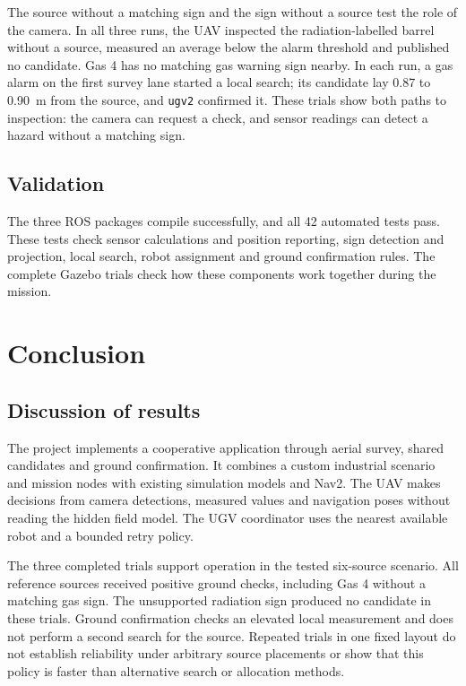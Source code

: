 \documentclass[conference]{IEEEtran}
\begin{document}
The source without a matching sign and the sign without a source test the role of the camera. In all three runs, the UAV inspected the radiation-labelled barrel without a source, measured an average below the alarm threshold and published no candidate. Gas 4 has no matching gas warning sign nearby. In each run, a gas alarm on the first survey lane started a local search; its candidate lay 0.87 to \SI{0.90}{\metre} from the source, and \texttt{ugv2} confirmed it. These trials show both paths to inspection: the camera can request a check, and sensor readings can detect a hazard without a matching sign.

\subsection{Validation}
The three ROS packages compile successfully, and all 42 automated tests pass. These tests check sensor calculations and position reporting, sign detection and projection, local search, robot assignment and ground confirmation rules. The complete Gazebo trials check how these components work together during the mission.

\section{Conclusion}
\subsection{Discussion of results}
The project implements a cooperative application through aerial survey, shared candidates and ground confirmation. It combines a custom industrial scenario and mission nodes with existing simulation models and Nav2. The UAV makes decisions from camera detections, measured values and navigation poses without reading the hidden field model. The UGV coordinator uses the nearest available robot and a bounded retry policy.

The three completed trials support operation in the tested six-source scenario. All reference sources received positive ground checks, including Gas 4 without a matching gas sign. The unsupported radiation sign produced no candidate in these trials. Ground confirmation checks an elevated local measurement and does not perform a second search for the source. Repeated trials in one fixed layout do not establish reliability under arbitrary source placements or show that this policy is faster than alternative search or allocation methods.
\end{document}
